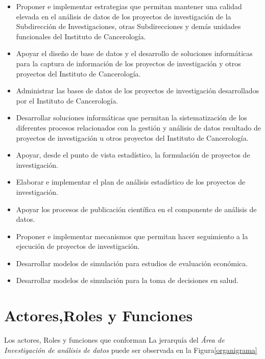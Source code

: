 \begin{itemize}
\item Proponer e implementar estrategias que permitan mantener una calidad elevada en el análisis de datos de los proyectos de investigación de la Subdirección de Investigaciones, otras Subdirecciones y demás unidades funcionales del Instituto de Cancerología.
\item Apoyar el diseño de base de datos y el desarrollo de soluciones informáticas para la captura de información de  los proyectos de investigación  y otros proyectos del Instituto de Cancerología.
\item Administrar las bases de datos de los proyectos de investigación desarrollados por el Instituto de Cancerología.
\item Desarrollar soluciones informáticas que permitan la sistematización de los diferentes procesos relacionados con la gestión y análisis de datos resultado de proyectos de investigación u otros proyectos del Instituto de Cancerología.
\item Apoyar, desde el punto de vista estadístico, la formulación de proyectos de investigación.
\item Elaborar e implementar el plan de análisis estadístico de los proyectos de investigación.
\item Apoyar los procesos de publicación científica en el componente de análisis de datos.
\item Proponer e implementar mecanismos que permitan hacer seguimiento a la ejecución de proyectos de investigación.
\item Desarrollar  modelos de simulación para estudios de evaluación económica.
\item Desarrollar modelos de simulación para la toma de decisiones en salud.
\end{itemize}

\newpage
\section{Actores,Roles y Funciones}
Los actores, Roles y funciones que conforman La jerarquía del \textit{Área de Investigación de análisis de datos} puede ser observada en la Figura\ref{organigrama}


